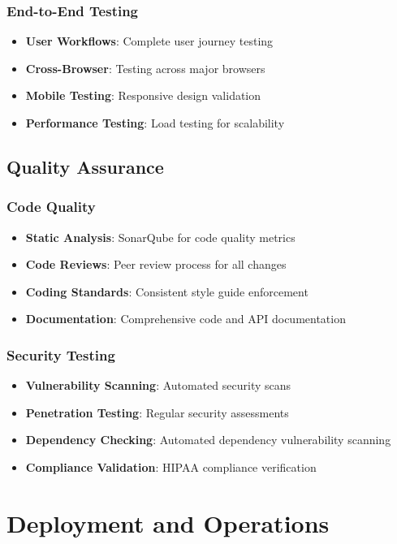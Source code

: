 \documentclass[12pt,a4paper]{article}
\begin{document}
\subsubsection{End-to-End Testing}
\begin{itemize}
    \item \textbf{User Workflows}: Complete user journey testing
    \item \textbf{Cross-Browser}: Testing across major browsers
    \item \textbf{Mobile Testing}: Responsive design validation
    \item \textbf{Performance Testing}: Load testing for scalability
\end{itemize}

\subsection{Quality Assurance}

\subsubsection{Code Quality}
\begin{itemize}
    \item \textbf{Static Analysis}: SonarQube for code quality metrics
    \item \textbf{Code Reviews}: Peer review process for all changes
    \item \textbf{Coding Standards}: Consistent style guide enforcement
    \item \textbf{Documentation}: Comprehensive code and API documentation
\end{itemize}

\subsubsection{Security Testing}
\begin{itemize}
    \item \textbf{Vulnerability Scanning}: Automated security scans
    \item \textbf{Penetration Testing}: Regular security assessments
    \item \textbf{Dependency Checking}: Automated dependency vulnerability scanning
    \item \textbf{Compliance Validation}: HIPAA compliance verification
\end{itemize}

\section{Deployment and Operations}
\end{document}
